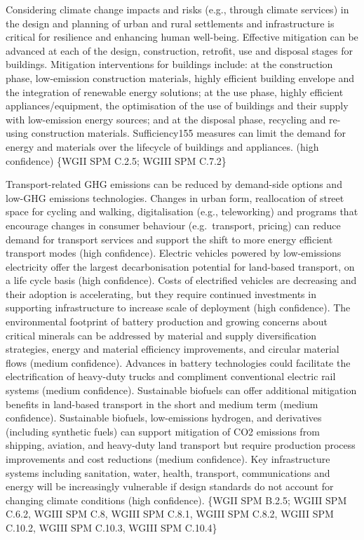 \documentclass[
  letterpaper,
  DIV=11,
  numbers=noendperiod]{scrreprt}
\begin{document}
Considering climate change impacts and risks (e.g., through climate
services) in the design and planning of urban and rural settlements and
infrastructure is critical for resilience and enhancing human
well-being. Effective mitigation can be advanced at each of the design,
construction, retrofit, use and disposal stages for buildings.
Mitigation interventions for buildings include: at the construction
phase, low-emission construction materials, highly efficient building
envelope and the integration of renewable energy solutions; at the use
phase, highly efficient appliances/equipment, the optimisation of the
use of buildings and their supply with low-emission energy sources; and
at the disposal phase, recycling and re-using construction materials.
Sufficiency155 measures can limit the demand for energy and materials
over the lifecycle of buildings and appliances. (high confidence) \{WGII
SPM C.2.5; WGIII SPM C.7.2\}

Transport-related GHG emissions can be reduced by demand-side options
and low-GHG emissions technologies. Changes in urban form, reallocation
of street space for cycling and walking, digitalisation (e.g.,
teleworking) and programs that encourage changes in consumer behaviour
(e.g.~transport, pricing) can reduce demand for transport services and
support the shift to more energy efficient transport modes (high
confidence). Electric vehicles powered by low-emissions electricity
offer the largest decarbonisation potential for land-based transport, on
a life cycle basis (high confidence). Costs of electrified vehicles are
decreasing and their adoption is accelerating, but they require
continued investments in supporting infrastructure to increase scale of
deployment (high confidence). The environmental footprint of battery
production and growing concerns about critical minerals can be addressed
by material and supply diversification strategies, energy and material
efficiency improvements, and circular material flows (medium
confidence). Advances in battery technologies could facilitate the
electrification of heavy-duty trucks and compliment conventional
electric rail systems (medium confidence). Sustainable biofuels can
offer additional mitigation benefits in land-based transport in the
short and medium term (medium confidence). Sustainable biofuels,
low-emissions hydrogen, and derivatives (including synthetic fuels) can
support mitigation of CO2 emissions from shipping, aviation, and
heavy-duty land transport but require production process improvements
and cost reductions (medium confidence). Key infrastructure systems
including sanitation, water, health, transport, communications and
energy will be increasingly vulnerable if design standards do not
account for changing climate conditions (high confidence). \{WGII SPM
B.2.5; WGIII SPM C.6.2, WGIII SPM C.8, WGIII SPM C.8.1, WGIII SPM C.8.2,
WGIII SPM C.10.2, WGIII SPM C.10.3, WGIII SPM C.10.4\}
\end{document}

